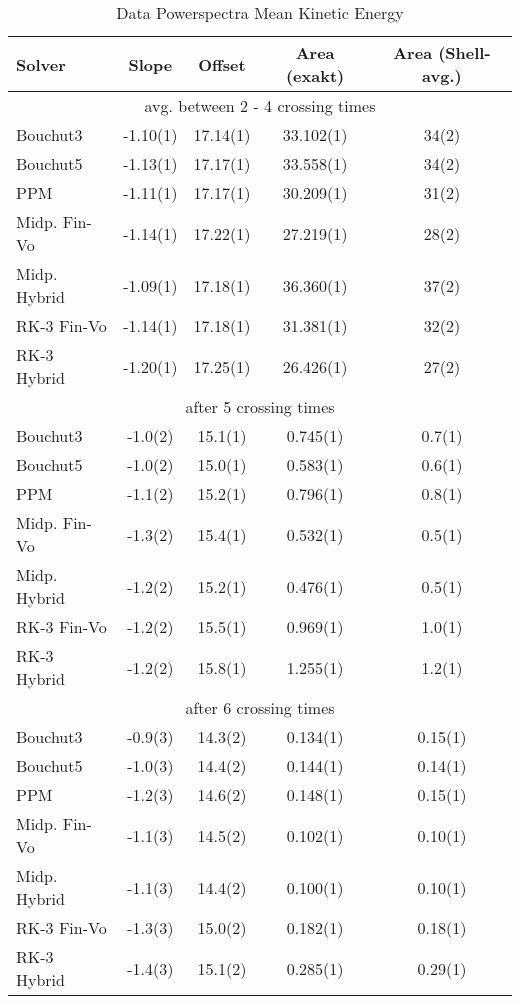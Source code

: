 \begin{table}[H]
\fontsize{3mm}{3mm}\selectfont
\captionsetup{width=.8\textwidth}
\caption{Data Powerspectra Mean Kinetic Energy}
\centering
\begin{tabular}{lcccc}
\toprule
Solver & Slope & Offset & Area (exakt) & Area (Shell-avg.) \\
\midrule
\multicolumn{5}{c}{avg. between 2 - 4 crossing times} \\
\midrule
Bouchut3 	     & -1.10(1) & 17.14(1) & 33.102(1) & 34(2) \\
Bouchut5 	     & -1.13(1) & 17.17(1) & 33.558(1) & 34(2) \\
PPM 	         & -1.11(1) & 17.17(1) & 30.209(1) & 31(2) \\
Midp. Fin-Vo 	 & -1.14(1) & 17.22(1) & 27.219(1) & 28(2) \\
Midp. Hybrid 	 & -1.09(1) & 17.18(1) & 36.360(1) & 37(2) \\
RK-3  Fin-Vo 	 & -1.14(1) & 17.18(1) & 31.381(1) & 32(2) \\
RK-3  Hybrid 	 & -1.20(1) & 17.25(1) & 26.426(1) & 27(2) \\
\midrule
\multicolumn{5}{c}{after 5 crossing times} \\
\midrule
Bouchut3 	    &  -1.0(2) & 15.1(1) & 0.745(1) & 0.7(1) \\
Bouchut5 	    &  -1.0(2) & 15.0(1) & 0.583(1) & 0.6(1) \\
PPM 	        &  -1.1(2) & 15.2(1) & 0.796(1) & 0.8(1) \\
Midp. Fin-Vo 	&  -1.3(2) & 15.4(1) & 0.532(1) & 0.5(1) \\
Midp. Hybrid 	&  -1.2(2) & 15.2(1) & 0.476(1) & 0.5(1) \\
RK-3  Fin-Vo 	&  -1.2(2) & 15.5(1) & 0.969(1) & 1.0(1) \\
RK-3  Hybrid 	&  -1.2(2) & 15.8(1) & 1.255(1) & 1.2(1) \\
\midrule
\multicolumn{5}{c}{after 6 crossing times} \\
\midrule
Bouchut3 	    & -0.9(3) & 14.3(2) & 0.134(1) & 0.15(1) \\
Bouchut5 	    & -1.0(3) & 14.4(2) & 0.144(1) & 0.14(1) \\
PPM 	        & -1.2(3) & 14.6(2) & 0.148(1) & 0.15(1) \\
Midp. Fin-Vo 	& -1.1(3) & 14.5(2) & 0.102(1) & 0.10(1) \\
Midp. Hybrid 	& -1.1(3) & 14.4(2) & 0.100(1) & 0.10(1) \\
RK-3  Fin-Vo 	& -1.3(3) & 15.0(2) & 0.182(1) & 0.18(1) \\
RK-3  Hybrid 	& -1.4(3) & 15.1(2) & 0.285(1) & 0.29(1) \\
\bottomrule
\end{tabular}
\label{tab:pws-ekin}
\end{table}







